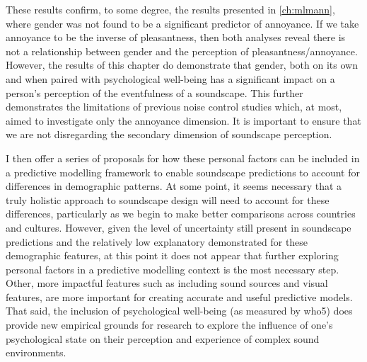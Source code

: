 These results confirm, to some degree, the results presented in \cref{ch:mlmann}, where gender was not found to be a significant predictor of annoyance. If we take annoyance to be the inverse of pleasantness, then both analyses reveal there is not a relationship between gender and the perception of pleasantness/annoyance. However, the results of this chapter do demonstrate that gender, both on its own and when paired with psychological well-being has a significant impact on a person's perception of the eventfulness of a soundscape. This further demonstrates the limitations of previous noise control studies which, at most, aimed to investigate only the annoyance dimension. It is important to ensure that we are not disregarding the secondary dimension of soundscape perception. 

I then offer a series of proposals for how these personal factors can be included in a predictive modelling framework to enable soundscape predictions to account for differences in demographic patterns. At some point, it seems necessary that a truly holistic approach to soundscape design will need to account for these differences, particularly as we begin to make better comparisons across countries and cultures. However, given the level of uncertainty still present in soundscape predictions and the relatively low explanatory demonstrated for these demographic features, at this point it does not appear that further exploring personal factors in a predictive modelling context is the most necessary step. Other, more impactful features such as including sound sources and visual features, are more important for creating accurate and useful predictive models. That said, the inclusion of psychological well-being (as measured by \gls{who5}) does provide new empirical grounds for research to explore the influence of one's psychological state on their perception and experience of complex sound environments.
